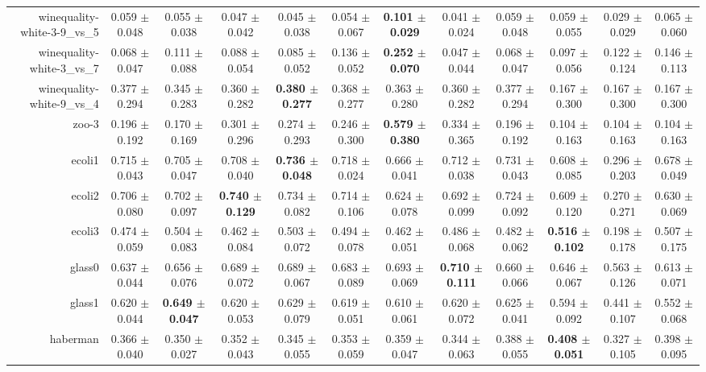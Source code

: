 \begin{table}[!ht]
{\begin{tabular}{r c c c c c c c c c c c}
winequality-white-3-9\_vs\_5 & 0.059 $\pm$ 0.048 & 0.055 $\pm$ 0.038 & 0.047 $\pm$ 0.042 & 0.045 $\pm$ 0.038 & 0.054 $\pm$ 0.067 & \textbf{0.101 $\pm$ 0.029} & 0.041 $\pm$ 0.024 & 0.059 $\pm$ 0.048 & 0.059 $\pm$ 0.055 & 0.029 $\pm$ 0.029 & 0.065 $\pm$ 0.060 \\
winequality-white-3\_vs\_7 & 0.068 $\pm$ 0.047 & 0.111 $\pm$ 0.088 & 0.088 $\pm$ 0.054 & 0.085 $\pm$ 0.052 & 0.136 $\pm$ 0.052 & \textbf{0.252 $\pm$ 0.070} & 0.047 $\pm$ 0.044 & 0.068 $\pm$ 0.047 & 0.097 $\pm$ 0.056 & 0.122 $\pm$ 0.124 & 0.146 $\pm$ 0.113 \\
winequality-white-9\_vs\_4 & 0.377 $\pm$ 0.294 & 0.345 $\pm$ 0.283 & 0.360 $\pm$ 0.282 & \textbf{0.380 $\pm$ 0.277} & 0.368 $\pm$ 0.277 & 0.363 $\pm$ 0.280 & 0.360 $\pm$ 0.282 & 0.377 $\pm$ 0.294 & 0.167 $\pm$ 0.300 & 0.167 $\pm$ 0.300 & 0.167 $\pm$ 0.300 \\
zoo-3 & 0.196 $\pm$ 0.192 & 0.170 $\pm$ 0.169 & 0.301 $\pm$ 0.296 & 0.274 $\pm$ 0.293 & 0.246 $\pm$ 0.300 & \textbf{0.579 $\pm$ 0.380} & 0.334 $\pm$ 0.365 & 0.196 $\pm$ 0.192 & 0.104 $\pm$ 0.163 & 0.104 $\pm$ 0.163 & 0.104 $\pm$ 0.163 \\
ecoli1 & 0.715 $\pm$ 0.043 & 0.705 $\pm$ 0.047 & 0.708 $\pm$ 0.040 & \textbf{0.736 $\pm$ 0.048} & 0.718 $\pm$ 0.024 & 0.666 $\pm$ 0.041 & 0.712 $\pm$ 0.038 & 0.731 $\pm$ 0.043 & 0.608 $\pm$ 0.085 & 0.296 $\pm$ 0.203 & 0.678 $\pm$ 0.049 \\
ecoli2 & 0.706 $\pm$ 0.080 & 0.702 $\pm$ 0.097 & \textbf{0.740 $\pm$ 0.129} & 0.734 $\pm$ 0.082 & 0.714 $\pm$ 0.106 & 0.624 $\pm$ 0.078 & 0.692 $\pm$ 0.099 & 0.724 $\pm$ 0.092 & 0.609 $\pm$ 0.120 & 0.270 $\pm$ 0.271 & 0.630 $\pm$ 0.069 \\
ecoli3 & 0.474 $\pm$ 0.059 & 0.504 $\pm$ 0.083 & 0.462 $\pm$ 0.084 & 0.503 $\pm$ 0.072 & 0.494 $\pm$ 0.078 & 0.462 $\pm$ 0.051 & 0.486 $\pm$ 0.068 & 0.482 $\pm$ 0.062 & \textbf{0.516 $\pm$ 0.102} & 0.198 $\pm$ 0.178 & 0.507 $\pm$ 0.175 \\
glass0 & 0.637 $\pm$ 0.044 & 0.656 $\pm$ 0.076 & 0.689 $\pm$ 0.072 & 0.689 $\pm$ 0.067 & 0.683 $\pm$ 0.089 & 0.693 $\pm$ 0.069 & \textbf{0.710 $\pm$ 0.111} & 0.660 $\pm$ 0.066 & 0.646 $\pm$ 0.067 & 0.563 $\pm$ 0.126 & 0.613 $\pm$ 0.071 \\
glass1 & 0.620 $\pm$ 0.044 & \textbf{0.649 $\pm$ 0.047} & 0.620 $\pm$ 0.053 & 0.629 $\pm$ 0.079 & 0.619 $\pm$ 0.051 & 0.610 $\pm$ 0.061 & 0.620 $\pm$ 0.072 & 0.625 $\pm$ 0.041 & 0.594 $\pm$ 0.092 & 0.441 $\pm$ 0.107 & 0.552 $\pm$ 0.068 \\
haberman & 0.366 $\pm$ 0.040 & 0.350 $\pm$ 0.027 & 0.352 $\pm$ 0.043 & 0.345 $\pm$ 0.055 & 0.353 $\pm$ 0.059 & 0.359 $\pm$ 0.047 & 0.344 $\pm$ 0.063 & 0.388 $\pm$ 0.055 & \textbf{0.408 $\pm$ 0.051} & 0.327 $\pm$ 0.105 & 0.398 $\pm$ 0.095 \\

\end{tabular}}
\end{table}

